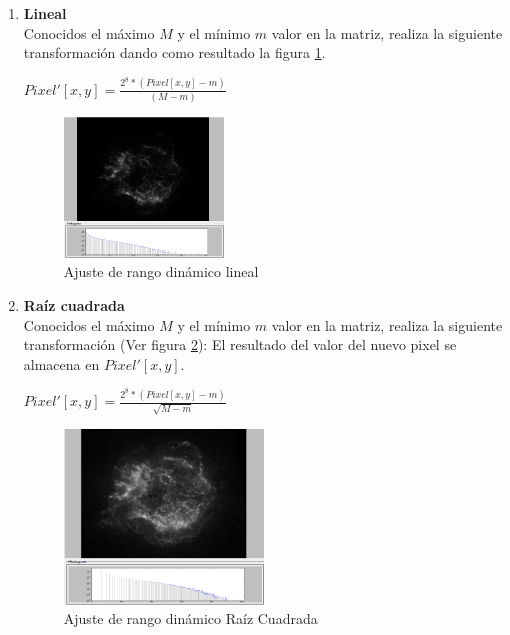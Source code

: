 	\begin{enumerate}
		\item \textbf{Lineal}\\
		Conocidos el máximo $M$ y el mínimo $m$ valor en la matriz, realiza
		la siguiente transformación dando como resultado la figura \ref{fig:HDRLineal}.
			\begin{center}
				{\large $Pixel'[x,y]=\frac{2^{8}*(Pixel[x,y]-m)}{(M-m)}$}				
			\end{center}
			
			\begin{figure}[!htb]
				\centering
				\includegraphics[width=0.4\textwidth]{images/HDREQ/chandraLineal.PNG}
				\caption{\label{fig:HDRLineal}{\small Ajuste de rango dinámico lineal}}
			\end{figure}
		\newpage
		\item \textbf{Raíz cuadrada}\\
		Conocidos el máximo $M$ y el mínimo $m$ valor en la matriz, realiza
		la siguiente transformación (Ver figura \ref{fig:HDRSQRT}):
		El resultado del valor del nuevo pixel se almacena en $Pixel'[x,y]$.
			\begin{center}
			{\large $Pixel'[x,y]=\frac{2^{8}*(Pixel[x,y]-m)}{\sqrt{M-m}}$}			
			\end{center}
			\begin{figure}[!htb]
				\centering
				\includegraphics[width=0.5\textwidth]{images/HDREQ/chandraSqrt.PNG}
				\caption{\label{fig:HDRSQRT}{\small Ajuste de rango dinámico Raíz Cuadrada}}

\end{figure}
\end{enumerate}
